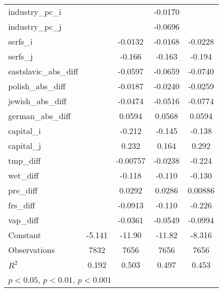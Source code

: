 {\begin{longtable}{l*{4}{c}}
industry\_pc\_i       &                     &                     &     -0.0170         &                     \\
industry\_pc\_j       &                     &                     &     -0.0696         &                     \\
serfs\_i             &                     &     -0.0132         &     -0.0168         &     -0.0228         \\
serfs\_j             &                     &      -0.166\sym{***}&      -0.163\sym{***}&      -0.194\sym{***}\\
eastslavic\_abs\_diff &                     &     -0.0597\sym{***}&     -0.0659\sym{***}&     -0.0740\sym{***}\\
polish\_abs\_diff     &                     &     -0.0187         &     -0.0240         &     -0.0259         \\
jewish\_abs\_diff     &                     &     -0.0474         &     -0.0516         &     -0.0774\sym{**} \\
german\_abs\_diff     &                     &      0.0594\sym{**} &      0.0568\sym{**} &      0.0594\sym{**} \\
capital\_i           &                     &      -0.212         &      -0.145         &      -0.138         \\
capital\_j           &                     &       0.232         &       0.164         &       0.292         \\
tmp\_diff            &                     &    -0.00757         &     -0.0238         &      -0.224\sym{***}\\
wet\_diff            &                     &      -0.118\sym{***}&      -0.110\sym{***}&      -0.130\sym{***}\\
pre\_diff            &                     &      0.0292\sym{***}&      0.0286\sym{***}&     0.00886\sym{*}  \\
frs\_diff            &                     &     -0.0913         &      -0.110         &      -0.226\sym{**} \\
vap\_diff            &                     &     -0.0361         &     -0.0549         &     -0.0994         \\
Constant            &      -5.141\sym{***}&      -11.90\sym{***}&      -11.82\sym{***}&      -8.316\sym{***}\\
\hline
Observations        &        7832         &        7656         &        7656         &        7656         \\
\(R^{2}\)           &       0.192         &       0.503         &       0.497         &       0.453         \\
\hline\hline
\multicolumn{5}{l}{\footnotesize \sym{*} \(p<0.05\), \sym{**} \(p<0.01\), \sym{***} \(p<0.001\)}\\
\end{longtable}
}
